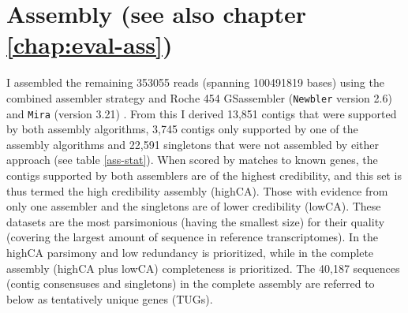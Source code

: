 \afterpage{\clearpage}

\section{Assembly (see also chapter \ref{chap:eval-ass})}


I assembled the remaining 353055 reads (spanning 100491819 bases)
using the combined assembler strategy \cite{pmid20950480} and Roche
454 GSassembler (\texttt{Newbler} version 2.6) and \texttt{Mira}
(version 3.21) \cite{miraEST}. From this I derived 13,851 contigs that
were supported by both assembly algorithms, 3,745 contigs only
supported by one of the assembly algorithms and 22,591 singletons that
were not assembled by either approach (see table \ref{ass-stat}). When
scored by matches to known genes, the contigs supported by both
assemblers are of the highest credibility, and this set is thus termed
the high credibility assembly (highCA). Those with evidence from only
one assembler and the singletons are of lower credibility
(lowCA). These datasets are the most parsimonious (having the smallest
size) for their quality (covering the largest amount of sequence in
reference transcriptomes). In the highCA parsimony and low redundancy
is prioritized, while in the complete assembly (highCA plus lowCA)
completeness is prioritized. The 40,187 sequences (contig consensuses
and singletons) in the complete assembly are referred to below as
tentatively unique genes (TUGs).

